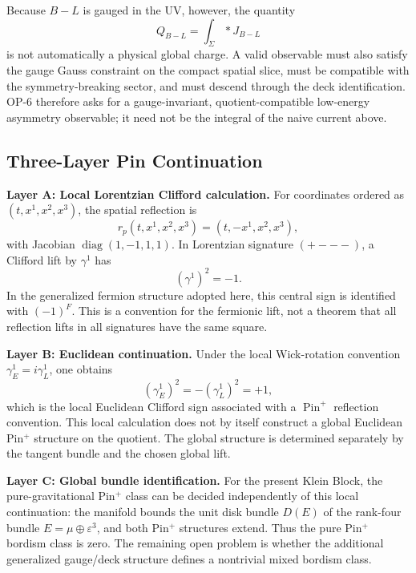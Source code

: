 \documentclass[11pt]{article}
\theoremstyle{canonmath}
\theoremstyle{canonpostulate}
\theoremstyle{canonclaim}
\providecommand{\Pin}{\operatorname{Pin}}
\begin{document}
Because $B-L$ is gauged in the UV, however, the quantity
\begin{equation}
Q_{B-L}=\int_{\Sigma}*J_{B-L}
\end{equation}
is not automatically a physical global charge. A valid observable must also satisfy the gauge Gauss constraint on the compact spatial slice, must be compatible with the symmetry-breaking sector, and must descend through the deck identification. OP-6 therefore asks for a gauge-invariant, quotient-compatible low-energy asymmetry observable; it need not be the integral of the naive current above.

\subsection{Three-Layer Pin Continuation}

\textbf{Layer A: Local Lorentzian Clifford calculation.}
For coordinates ordered as $(t,x^1,x^2,x^3)$, the spatial reflection is
\begin{equation}
r_p(t,x^1,x^2,x^3)=(t,-x^1,x^2,x^3),
\end{equation}
with Jacobian $\operatorname{diag}(1,-1,1,1)$. In Lorentzian signature $(+---)$, a Clifford lift by $\gamma^1$ has
\begin{equation}
(\gamma^1)^2=-1.
\end{equation}
In the generalized fermion structure adopted here, this central sign is identified with $(-1)^F$. This is a convention for the fermionic lift, not a theorem that all reflection lifts in all signatures have the same square.

\textbf{Layer B: Euclidean continuation.}
Under the local Wick-rotation convention $\gamma_E^1=i\gamma_L^1$, one obtains
\begin{equation}
(\gamma_E^1)^2=-(\gamma_L^1)^2=+1,
\end{equation}
which is the local Euclidean Clifford sign associated with a $\Pin^+$ reflection convention. This local calculation does not by itself construct a global Euclidean Pin$^+$ structure on the quotient. The global structure is determined separately by the tangent bundle and the chosen global lift.

\textbf{Layer C: Global bundle identification.}
For the present Klein Block, the pure-gravitational Pin$^+$ class can be decided independently of this local continuation: the manifold bounds the unit disk bundle $D(E)$ of the rank-four bundle $E=\mu\oplus\varepsilon^3$, and both Pin$^+$ structures extend. Thus the pure Pin$^+$ bordism class is zero. The remaining open problem is whether the additional generalized gauge/deck structure defines a nontrivial mixed bordism class.
\end{document}
